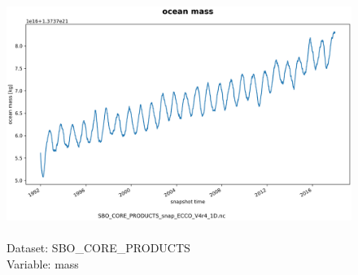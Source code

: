 \begin{figure}[H]
\centering
\includegraphics[scale=0.5]{../images/plots/oneD_plots/SBO_Core_Products/mass.png}
\caption{\\Dataset: SBO\_CORE\_PRODUCTS\\Variable: mass}
\label{tab:table-SBO_CORE_PRODUCTS_mass-Plot}
\end{figure}
\pagebreak
